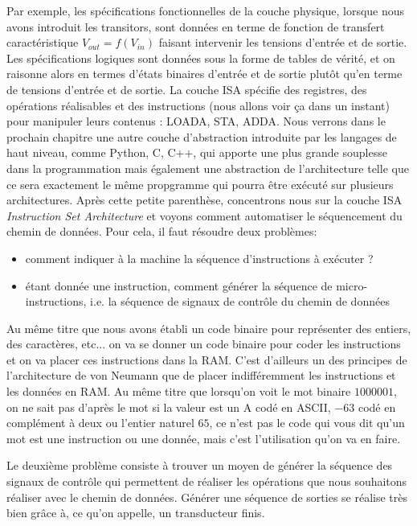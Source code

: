 Par exemple, les spécifications fonctionnelles de la couche physique, lorsque nous avons introduit les transitors, sont données en terme de fonction de transfert caractéristique $V_{out} = f(V_{in})$ faisant intervenir les tensions d'entrée et de sortie. Les spécifications logiques sont données sous la forme de tables de vérité, et on raisonne alors en termes d'états binaires d'entrée et de sortie plutôt qu'en terme de tensions d'entrée et de sortie. La couche ISA spécifie des registres, des opérations réalisables et des instructions (nous allons voir ça dans un instant) pour manipuler leurs contenus : LOADA, STA, ADDA. Nous verrons dans le prochain chapitre une autre couche d'abstraction introduite par les langages de haut niveau, comme Python, C, C++, qui apporte une plus grande souplesse dans la programmation mais également une abstraction de l'architecture telle que ce sera exactement le même propgramme qui pourra être exécuté sur plusieurs architectures. Après cette petite parenthèse, concentrons nous sur la couche ISA \emph{Instruction Set Architecture} et voyons comment automatiser le séquencement du chemin de données. Pour cela, il faut résoudre deux problèmes:
\begin{itemize}
\item comment indiquer à la machine la séquence d'instructions à exécuter ?
\item étant donnée une instruction, comment générer la séquence de micro-instructions, i.e. la séquence de signaux de contrôle du chemin de données
\end{itemize}
Au même titre que nous avons établi un code binaire pour représenter des entiers, des caractères, etc... on va se donner un code binaire pour coder les instructions et on va placer ces instructions dans la RAM. C'est d'ailleurs un des principes de l'architecture de von Neumann que de placer indifféremment les instructions et les données en RAM. Au même titre que lorsqu'on voit le mot binaire $1000001$, on ne sait pas d'après le mot si la valeur est un A codé en ASCII, $-63$ codé en complément à deux ou l'entier naturel $65$, ce n'est pas le code qui vous dit qu'un mot est une instruction ou une donnée, mais c'est l'utilisation qu'on va en faire.

Le deuxième problème consiste à trouver un moyen de générer la séquence des signaux de contrôle qui permettent de réaliser les opérations que nous souhaitons réaliser avec le chemin de données. Générer une séquence de sorties se réalise très bien grâce à, ce qu'on appelle, un transducteur finis.

